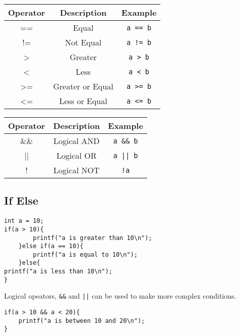 \documentclass[a4paper, 10pt]{article}
\begin{document}
\vspace{1em}
\begin{minipage}{0.50\textwidth}
    \centering
    \begin{tabular}{|c|c|c|}
        \hline
        Operator & Description      & Example         \\
        \hline
        ==       & Equal            & \texttt{a == b} \\
        \hline
        !=       & Not Equal        & \texttt{a != b} \\
        \hline
        >        & Greater          & \texttt{a > b}  \\
        \hline
        <        & Less             & \texttt{a < b}  \\
        \hline
        >=       & Greater or Equal & \texttt{a >= b} \\
        \hline
        <=       & Less or Equal    & \texttt{a <= b} \\
        \hline
    \end{tabular}
\end{minipage}
\hfill
\begin{minipage}{0.45\textwidth}
    \centering
    \begin{tabular}{|c|c|c|}
        \hline
        Operator & Description & Example           \\
        \hline
        \&\&     & Logical AND & \texttt{a \&\& b} \\
        \hline
        ||       & Logical OR  & \texttt{a || b}   \\
        \hline
        !        & Logical NOT & \texttt{!a}       \\
        \hline
    \end{tabular}
\end{minipage}

\subsection{If Else}
\begin{lstlisting}[style=cStyle, caption={If-Else}]
int a = 10;
if(a > 10){
        printf("a is greater than 10\n");
    }else if(a == 10){
        printf("a is equal to 10\n");
    }else{
printf("a is less than 10\n");
}
\end{lstlisting}
Logical opeators, \texttt{\&\&} and \texttt{||} can be used to make more complex conditions.
\begin{lstlisting}[style=cStyle, caption={Complex If-Else}]
if(a > 10 && a < 20){
    printf("a is between 10 and 20\n");
}
\end{lstlisting}
\end{document}

